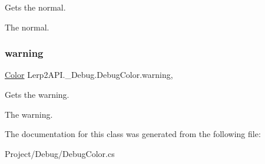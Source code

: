 Gets the normal. 

The normal.\mbox{\label{class_lerp2_a_p_i_1_1___debug_1_1_debug_color_ae6c20989f1716185acc88fa8535ec1bc}} 
\subsubsection{\texorpdfstring{warning}{warning}}
{\footnotesize\ttfamily \hyperlink{struct_lerp2_a_p_i_1_1_optimizers_1_1_color}{Color} Lerp2\+A\+P\+I.\+\_\+\+Debug.\+Debug\+Color.\+warning\hspace{0.3cm}{\ttfamily [static]}, {\ttfamily [get]}}



Gets the warning. 

The warning.

The documentation for this class was generated from the following file\+:\begin{DoxyCompactItemize}
\item 
Project/\+Debug/Debug\+Color.\+cs\end{DoxyCompactItemize}
